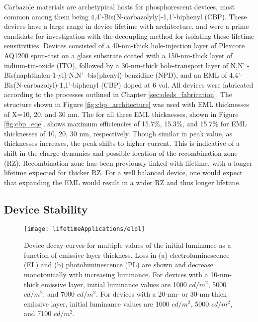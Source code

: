 \documentclass[../thesis.tex]{subfiles}
\begin{document}
Carbazole materials are archetypical hosts for phosphorescent devices, most common among them being 4,4'-Bis(N-carbazolyly)-1,1'-biphenyl (CBP).\supercite{Han2014,OBrien1999a,Cho2014,Price2015,Adachi2001,Watanabe2007,Holmes2003,Adamovich2003}
These devices have a large range in device lifetime with architecture, and were a prime candidate for investigation with the decoupling method for isolating these lifetime sensitivities.
Devices consisted of a 40-nm-thick hole-injection layer of Plexcore AQ1200 spun-cast on a glass substrate coated with a 150-nm-thick layer of  indium-tin-oxide (ITO), followed by a 30-nm-thick hole-transport layer of N,N' -Bis(naphthalen-1-yl)-N,N' -bis(phenyl)-benzidine (NPD), and an EML of 4,4'-Bis(N-carbazolyl)-1,1'-biphenyl (CBP) doped at 6 vol. %
All devices were fabricated according to the processes outlined in Chapter \ref{sec:oleds_fabrication}.
The structure shown in Figure \ref{fig:cbp_architecture} was used with EML thicknesses of X=10, 20, and 30 nm.
The \eqe for all three EML thicknesses, shown in Figure \ref{fig:cbp_eqe}, shows maximum efficiencies of 15.7\%, 15.3\%, and 15.7\% for EML thicknesses of 10, 20, 30 nm, respectively.
Though similar in peak value, as thicknesses increases, the peak \eqe shifts to higher current.
This is indicative of a shift in the charge dynamics and possible location of the recombination zone (RZ).
Recombination zone has been previously linked with lifetime, with a longer lifetime expected for thicker RZ.\supercite{Zhang2014,Wu2016,Chin2005,Lee2006,Chwang2002,Han2016,Lee2005a,Brown2004,Choong2000,Liu2004}
For a well balanced device, one would expect that expanding the EML would result in a wider RZ and thus longer lifetime.

\subsection{Device Stability}

\begin{figure}[ht]
\centering
\texttt{[image: lifetimeApplications/elpl]}
\caption{Device decay curves for multiple values of the initial luminance as a function of emissive layer thickness.  Loss in (a) electroluminescence (EL) and (b) photoluminescence (PL) are shown and decrease monotonically with increasing luminance.  For devices with a 10-nm-thick emissive layer, initial luminance values are 1000 $cd/m^2$, 5000 $cd/m^2$, and 7000 $cd/m^2$.  For devices with a 20-nm- or 30-nm-thick emissive layer, initial luminance values are 1000 $cd/m^2$, 5000 $cd/m^2$, and 7100 $cd/m^2$. }
\label{fig:cbp_elpl}
\end{figure}
\end{document}
